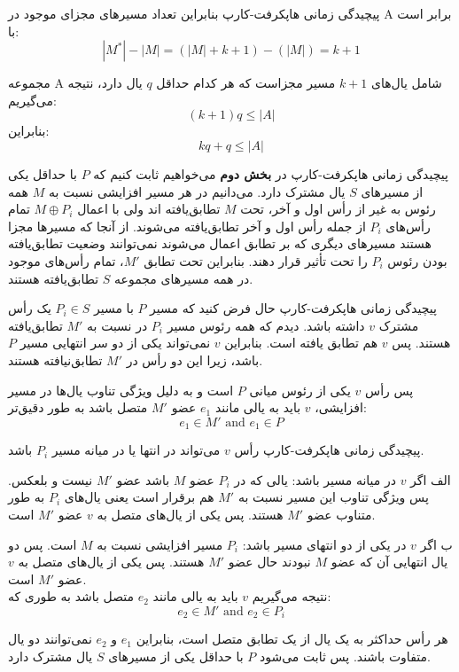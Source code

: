 \begin{itemframe}{‌پیچیدگی زمانی هاپکرفت-کارپ}
\itm
بنابراین تعداد مسیرهای مجزای موجود در A برابر است با:
$$
|M^*| - |M| = (|M| + k + 1) - (|M|) = k + 1
$$

\itm
مجموعه A شامل یال‌های
$k + 1$
مسیر مجزاست که هر کدام حداقل $q$ یال دارد، نتیجه می‌گیریم:
$$
(k + 1)q \leq |A|
$$
بنابراین:
$$
kq + q \leq |A|
$$
\end{itemframe}


\begin{itemframe}{‌پیچیدگی زمانی هاپکرفت-کارپ}
\itm
در \textbf{بخش دوم } می‌خواهیم ثابت کنیم که $P$ با حداقل یکی از مسیرهای $S$ یال مشترک دارد.
\itm
می‌دانیم در هر مسیر افزایشی نسبت به $M$ همه رئوس به غیر از رأس اول و آخر، تحت $M$ تطابق‌یافته اند ولی با اعمال
$M \oplus P_i$
 تمام رأس‌های $P_i$ از جمله رأس اول و آخر تطابق‌یافته می‌شوند.
\itm
 از آنجا که مسیرها مجزا هستند مسیرهای دیگری که بر تطابق اعمال می‌شوند نمی‌توانند وضعیت تطابق‌یافته بودن رئوس $P_i$ را تحت تأثیر قرار دهند.
\itm
 بنابراین تحت تطابق $M'$، تمام رأس‌های موجود در همه مسیرهای مجموعه $S$ تطابق‌یافته هستند.
\end{itemframe}


\begin{itemframe}{‌پیچیدگی زمانی هاپکرفت-کارپ}
\itm
 حال فرض کنید که مسیر $P$ با مسیر $P_i \in S$ یک رأس مشترک $v$ داشته باشد. دیدم که همه رئوس مسیر $P_i$ در نسبت به $M'$‌ تطابق‌یافته هستند. پس $v$ هم تطابق یافته است.
\itm
بنابراین $v$ نمی‌تواند یکی از دو سر انتهایی مسیر $P$ باشد، زیرا این دو رأس در $M'$ تطابق‌نیافته هستند.

پس رأس $v$ یکی از رئوس میانی $P$ است و به دلیل ویژگی تناوب یال‌ها در مسیر افزایشی، $v$ باید به یالی مانند
$e_1$
عضو $M'$ متصل باشد به طور دقیق‌تر:
$$e_1 \in M' \text{ and } e_1 \in P$$

\end{itemframe}


\begin{itemframe}{‌پیچیدگی زمانی هاپکرفت-کارپ}
\decLineSpace
\itm
رأس $v$ می‌تواند در انتها یا در میانه مسیر $P_i$ باشد.
\item[الف]
اگر $v$ در میانه مسیر باشد: یالی که در $P_i$ عضو  $M$ باشد عضو $M'$ نیست و بلعکس. پس ویژگی تناوب این مسیر نسبت به $M'$ هم برقرار است یعنی یال‌های $P_i$ به طور متناوب عضو $M'$ هستند. پس یکی از یال‌های متصل به $v$ عضو $M'$ است.
\item[ب]
اگر $v$ در یکی از دو انتهای مسیر باشد: $P_i$ مسیر افزایشی نسبت به $M$ است. پس دو یال انتهایی آن که عضو $M$ نبودند حال عضو $M'$ هستند. پس یکی از یال‌های متصل به $v$ عضو $M'$ است.\\
\itm
نتیجه می‌گیریم $v$ باید به یالی مانند
$e_2$
 متصل باشد به طوری که:
$$e_2 \in M' \text{ and } e_2 \in P_i$$


\itm
هر رأس حداکثر به یک یال از یک تطابق متصل است، بنابراین
$e_1$
و
$e_2$
نمی‌توانند دو یال متفاوت باشند. پس ثابت می‌شود $P$ با حداقل یکی از مسیرهای $S$ یال مشترک دارد.
\end{itemframe}


